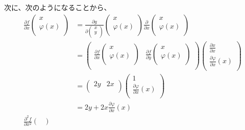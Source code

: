 \documentclass[dvipdfmx]{jsarticle}
\begin{document}
次に、次のようになることから、
\begin{align*}
\frac{\partial f}{\partial x}\begin{pmatrix}
x \\
\varphi(x) \\
\end{pmatrix} &= \frac{\partial g}{\partial\begin{pmatrix}
x \\
y \\
\end{pmatrix}}\begin{pmatrix}
x \\
\varphi(x) \\
\end{pmatrix}\frac{\partial}{\partial x}\begin{pmatrix}
x \\
\varphi(x) \\
\end{pmatrix} \\
&= \begin{pmatrix}
\frac{\partial f}{\partial x}\begin{pmatrix}
x \\
\varphi(x) \\
\end{pmatrix} & \frac{\partial f}{\partial y}\begin{pmatrix}
x \\
\varphi(x) \\
\end{pmatrix} \\
\end{pmatrix}\begin{pmatrix}
\frac{\partial x}{\partial x} \\
\frac{\partial\varphi}{\partial x}(x) \\
\end{pmatrix}\\
&= \begin{pmatrix}
2y & 2x \\
\end{pmatrix}\begin{pmatrix}
1 \\
\frac{\partial\varphi}{\partial x}(x) \\
\end{pmatrix} \\
&= 2y + 2x\frac{\partial\varphi}{\partial x}(x)\\
\frac{\partial^{2}f}{\partial x^{2}}\begin{pmatrix}

\end{pmatrix}
\end{align*}
\end{document}

